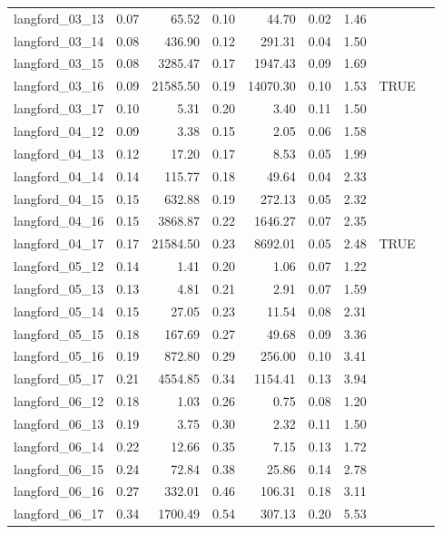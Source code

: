\documentclass[runningheads]{llncs}
\begin{document}
\begin{table}[ht]
\begin{tabular}{lrrrrrrll}
 langford\_03\_13 & 0.07 & 65.52 & 0.10 & 44.70 & 0.02 & 1.46 &   &   \\ 
 langford\_03\_14 & 0.08 & 436.90 & 0.12 & 291.31 & 0.04 & 1.50 &   &   \\ 
 langford\_03\_15 & 0.08 & 3285.47 & 0.17 & 1947.43 & 0.09 & 1.69 &   &   \\
 langford\_03\_16 & 0.09 & 21585.50 & 0.19 & 14070.30 & 0.10 & 1.53 & TRUE &   \\ 
 langford\_03\_17 & 0.10 & 5.31 & 0.20 & 3.40 & 0.11 & 1.50 &   &   \\ 
 langford\_04\_12 & 0.09 & 3.38 & 0.15 & 2.05 & 0.06 & 1.58 &   &   \\ 
 langford\_04\_13 & 0.12 & 17.20 & 0.17 & 8.53 & 0.05 & 1.99 &   &   \\ 
 langford\_04\_14 & 0.14 & 115.77 & 0.18 & 49.64 & 0.04 & 2.33 &   &   \\ 
 langford\_04\_15 & 0.15 & 632.88 & 0.19 & 272.13 & 0.05 & 2.32 &   &   \\ 
 langford\_04\_16 & 0.15 & 3868.87 & 0.22 & 1646.27 & 0.07 & 2.35 &   &   \\ 
 langford\_04\_17 & 0.17 & 21584.50 & 0.23 & 8692.01 & 0.05 & 2.48 & TRUE &   \\ 
 langford\_05\_12 & 0.14 & 1.41 & 0.20 & 1.06 & 0.07 & 1.22 &   &   \\ 
 langford\_05\_13 & 0.13 & 4.81 & 0.21 & 2.91 & 0.07 & 1.59 &   &   \\ 
 langford\_05\_14 & 0.15 & 27.05 & 0.23 & 11.54 & 0.08 & 2.31 &   &   \\ 
 langford\_05\_15 & 0.18 & 167.69 & 0.27 & 49.68 & 0.09 & 3.36 &   &   \\ 
 langford\_05\_16 & 0.19 & 872.80 & 0.29 & 256.00 & 0.10 & 3.41 &   &   \\ 
 langford\_05\_17 & 0.21 & 4554.85 & 0.34 & 1154.41 & 0.13 & 3.94 &   &   \\ 
 langford\_06\_12 & 0.18 & 1.03 & 0.26 & 0.75 & 0.08 & 1.20 &   &   \\ 
 langford\_06\_13 & 0.19 & 3.75 & 0.30 & 2.32 & 0.11 & 1.50 &   &   \\ 
 langford\_06\_14 & 0.22 & 12.66 & 0.35 & 7.15 & 0.13 & 1.72 &   &   \\ 
 langford\_06\_15 & 0.24 & 72.84 & 0.38 & 25.86 & 0.14 & 2.78 &   &   \\ 
 langford\_06\_16 & 0.27 & 332.01 & 0.46 & 106.31 & 0.18 & 3.11 &   &   \\ 
 langford\_06\_17 & 0.34 & 1700.49 & 0.54 & 307.13 & 0.20 & 5.53 &   &   \\ 

\end{tabular}
\end{table}
\end{document}
